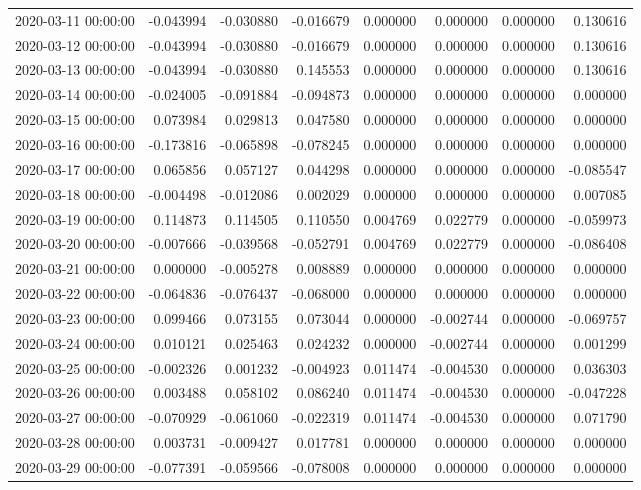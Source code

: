 \begin{tabular}{lrrrrrrr}
2020-03-11 00:00:00 & -0.043994 & -0.030880 & -0.016679 & 0.000000 & 0.000000 & 0.000000 & 0.130616 \\
2020-03-12 00:00:00 & -0.043994 & -0.030880 & -0.016679 & 0.000000 & 0.000000 & 0.000000 & 0.130616 \\
2020-03-13 00:00:00 & -0.043994 & -0.030880 & 0.145553 & 0.000000 & 0.000000 & 0.000000 & 0.130616 \\
2020-03-14 00:00:00 & -0.024005 & -0.091884 & -0.094873 & 0.000000 & 0.000000 & 0.000000 & 0.000000 \\
2020-03-15 00:00:00 & 0.073984 & 0.029813 & 0.047580 & 0.000000 & 0.000000 & 0.000000 & 0.000000 \\
2020-03-16 00:00:00 & -0.173816 & -0.065898 & -0.078245 & 0.000000 & 0.000000 & 0.000000 & 0.000000 \\
2020-03-17 00:00:00 & 0.065856 & 0.057127 & 0.044298 & 0.000000 & 0.000000 & 0.000000 & -0.085547 \\
2020-03-18 00:00:00 & -0.004498 & -0.012086 & 0.002029 & 0.000000 & 0.000000 & 0.000000 & 0.007085 \\
2020-03-19 00:00:00 & 0.114873 & 0.114505 & 0.110550 & 0.004769 & 0.022779 & 0.000000 & -0.059973 \\
2020-03-20 00:00:00 & -0.007666 & -0.039568 & -0.052791 & 0.004769 & 0.022779 & 0.000000 & -0.086408 \\
2020-03-21 00:00:00 & 0.000000 & -0.005278 & 0.008889 & 0.000000 & 0.000000 & 0.000000 & 0.000000 \\
2020-03-22 00:00:00 & -0.064836 & -0.076437 & -0.068000 & 0.000000 & 0.000000 & 0.000000 & 0.000000 \\
2020-03-23 00:00:00 & 0.099466 & 0.073155 & 0.073044 & 0.000000 & -0.002744 & 0.000000 & -0.069757 \\
2020-03-24 00:00:00 & 0.010121 & 0.025463 & 0.024232 & 0.000000 & -0.002744 & 0.000000 & 0.001299 \\
2020-03-25 00:00:00 & -0.002326 & 0.001232 & -0.004923 & 0.011474 & -0.004530 & 0.000000 & 0.036303 \\
2020-03-26 00:00:00 & 0.003488 & 0.058102 & 0.086240 & 0.011474 & -0.004530 & 0.000000 & -0.047228 \\
2020-03-27 00:00:00 & -0.070929 & -0.061060 & -0.022319 & 0.011474 & -0.004530 & 0.000000 & 0.071790 \\
2020-03-28 00:00:00 & 0.003731 & -0.009427 & 0.017781 & 0.000000 & 0.000000 & 0.000000 & 0.000000 \\
2020-03-29 00:00:00 & -0.077391 & -0.059566 & -0.078008 & 0.000000 & 0.000000 & 0.000000 & 0.000000 \\

\end{tabular}
